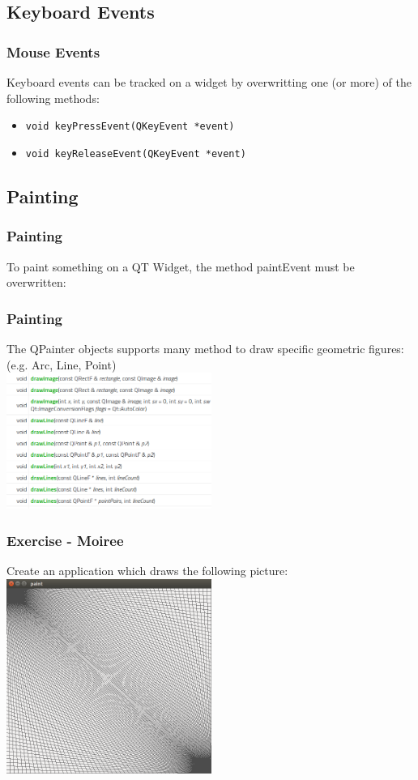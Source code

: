 \subsection{Keyboard Events}
\begin{frame}[fragile]
\frametitle{Mouse Events}
Keyboard events can be tracked on a widget by
overwritting one (or more) of the following methods:

\begin{itemize}
\item \verb|void keyPressEvent(QKeyEvent *event)|
\item \verb|void keyReleaseEvent(QKeyEvent *event)|
\end{itemize}

\end{frame}



\subsection{Painting}
\begin{frame}[fragile]
\frametitle{Painting}
To paint something on a QT Widget, the method paintEvent must be overwritten:

\end{frame}

\begin{frame}[fragile]
\frametitle{Painting}
The QPainter objects supports many method to draw specific geometric figures:
	(e.g. Arc, Line, Point)\\
	\vspace{3mm}
        \includegraphics[width=190pt]{img/painter.png}
\end{frame}

\begin{frame}[fragile]
\frametitle{Exercise - Moiree}
Create an application which draws the following picture:\\
\vspace{3mm}
\includegraphics[width=190pt]{img/moiree.png}
\end{frame}

